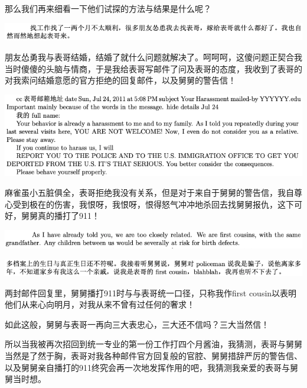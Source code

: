 \documentclass[9pt, b5paper]{article}
\begin{document}
那么我们再来细看一下他们试探的方法与结果是什么呢？

\begin{center}
\includegraphics[width=.9\linewidth]{./pic/backups_plans_20210412_172222.png}
\end{center}

朋友怂勇我与表哥结婚，结婚了就什么问题就解决了。呵呵呵，这傻问题正契合我当时傻傻的头脑与情商，于是我给表哥写邮件了问及表哥的态度，我收到了表哥的对我索问结婚意愿的官方拒绝的回复邮件，以及舅舅的警告信！

\begin{center}
\includegraphics[width=.9\linewidth]{./pic/backups_plans_20210412_172303.png}
\end{center}

麻雀虽小五脏俱全，表哥拒绝我没有关系，但是对于来自于舅舅的警告信，我自尊心受到极在的伤害，我恨呀，我恨呀，恨得怒气冲冲地杀回去找舅舅报仇，这下可好，舅舅真的播打了911！

\begin{center}
\includegraphics[width=.9\linewidth]{./pic/backups_plans_20210412_172426.png}
\end{center}

\begin{center}
\includegraphics[width=.9\linewidth]{./pic/backups_plans_20210412_172523.png}
\end{center}

两封邮件回复里，舅舅播打911时与与表哥统一口径，只称我作first cousin以表明他们从来心向明月，对我从来不曾有过任何的奢求！

如此这般，舅舅与表哥一再向三大表忠心，三大还不信吗？三大当然信！

所以当我被再次招回到统一专业的第一份工作打四个月酱油，我猜测，表哥与舅舅当然是了然于胸，表哥对我各种邮件官方回复般的官腔、舅舅措辞严厉的警告信、以及舅舅亲自播打的911终究会再一次地发挥作用的吧，我猜测我亲爱的表哥与舅舅当时想。 
\end{document}
